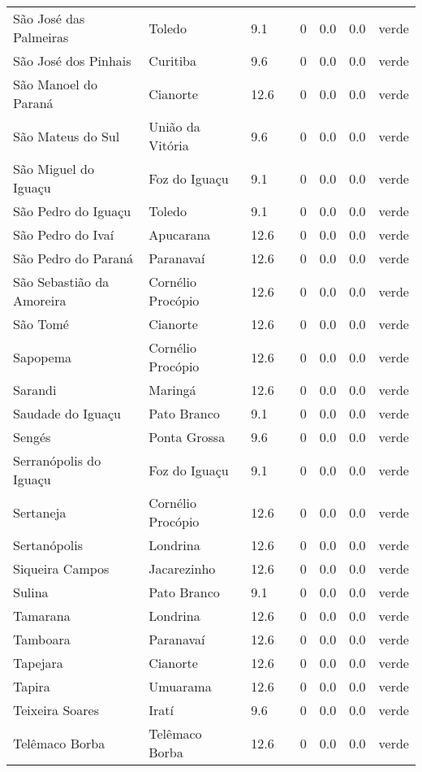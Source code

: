 \begin{longtable}{l|lllllll}
  São José das Palmeiras & Toledo & 9.1 &  & 0 & 0.0 & 0.0 & verde \\ 
  São José dos Pinhais & Curitiba & 9.6 &  & 0 & 0.0 & 0.0 & verde \\ 
  São Manoel do Paraná & Cianorte & 12.6 &  & 0 & 0.0 & 0.0 & verde \\ 
  São Mateus do Sul & União da Vitória & 9.6 &  & 0 & 0.0 & 0.0 & verde \\ 
  São Miguel do Iguaçu & Foz do Iguaçu & 9.1 &  & 0 & 0.0 & 0.0 & verde \\ 
  São Pedro do Iguaçu & Toledo & 9.1 &  & 0 & 0.0 & 0.0 & verde \\ 
  São Pedro do Ivaí & Apucarana & 12.6 &  & 0 & 0.0 & 0.0 & verde \\ 
  São Pedro do Paraná & Paranavaí & 12.6 &  & 0 & 0.0 & 0.0 & verde \\ 
  São Sebastião da Amoreira & Cornélio Procópio & 12.6 &  & 0 & 0.0 & 0.0 & verde \\ 
  São Tomé & Cianorte & 12.6 &  & 0 & 0.0 & 0.0 & verde \\ 
  Sapopema & Cornélio Procópio & 12.6 &  & 0 & 0.0 & 0.0 & verde \\ 
  Sarandi & Maringá & 12.6 &  & 0 & 0.0 & 0.0 & verde \\ 
  Saudade do Iguaçu & Pato Branco & 9.1 &  & 0 & 0.0 & 0.0 & verde \\ 
  Sengés & Ponta Grossa & 9.6 &  & 0 & 0.0 & 0.0 & verde \\ 
  Serranópolis do Iguaçu & Foz do Iguaçu & 9.1 &  & 0 & 0.0 & 0.0 & verde \\ 
  Sertaneja & Cornélio Procópio & 12.6 &  & 0 & 0.0 & 0.0 & verde \\ 
  Sertanópolis & Londrina & 12.6 &  & 0 & 0.0 & 0.0 & verde \\ 
  Siqueira Campos & Jacarezinho & 12.6 &  & 0 & 0.0 & 0.0 & verde \\ 
  Sulina & Pato Branco & 9.1 &  & 0 & 0.0 & 0.0 & verde \\ 
  Tamarana & Londrina & 12.6 &  & 0 & 0.0 & 0.0 & verde \\ 
  Tamboara & Paranavaí & 12.6 &  & 0 & 0.0 & 0.0 & verde \\ 
  Tapejara & Cianorte & 12.6 &  & 0 & 0.0 & 0.0 & verde \\ 
  Tapira & Umuarama & 12.6 &  & 0 & 0.0 & 0.0 & verde \\ 
  Teixeira Soares & Iratí & 9.6 &  & 0 & 0.0 & 0.0 & verde \\ 
  Telêmaco Borba & Telêmaco Borba & 12.6 &  & 0 & 0.0 & 0.0 & verde \\ 

\end{longtable}
